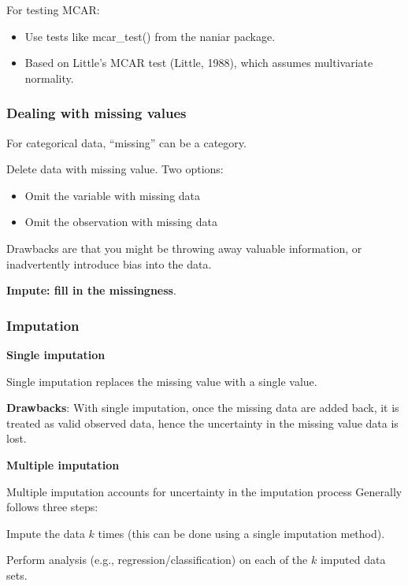 For testing MCAR:

\begin{itemize}
    \item Use tests like mcar\_test() from the naniar package.
    \item Based on Little’s MCAR test (Little, 1988), which assumes multivariate normality.
\end{itemize}

\subsubsection{Dealing with missing values}

\indent 

For categorical data, “missing” can be a category.

Delete data with missing value. Two options:

\begin{itemize}
    \item Omit the variable with missing data
    \item Omit the observation with missing data
\end{itemize}

Drawbacks are that you might be throwing away valuable information, or inadvertently introduce bias into the data.

\textbf{Impute: fill in the missingness}.

\subsubsection{Imputation}

\indent 

\noindent\textbf{Single imputation}

Single imputation replaces the missing value with a single value.

\textbf{Drawbacks}: With single imputation, once the missing data are added back, it is treated as valid observed data, hence the uncertainty in the missing value data is lost.

\bigskip

\noindent\textbf{Multiple imputation}

Multiple imputation accounts for uncertainty in the imputation process
Generally follows three steps:

\step Impute the data $k$ times (this can be done using a single imputation method).

\step Perform analysis (e.g., regression/classification) on each of the $k$ imputed data sets.

